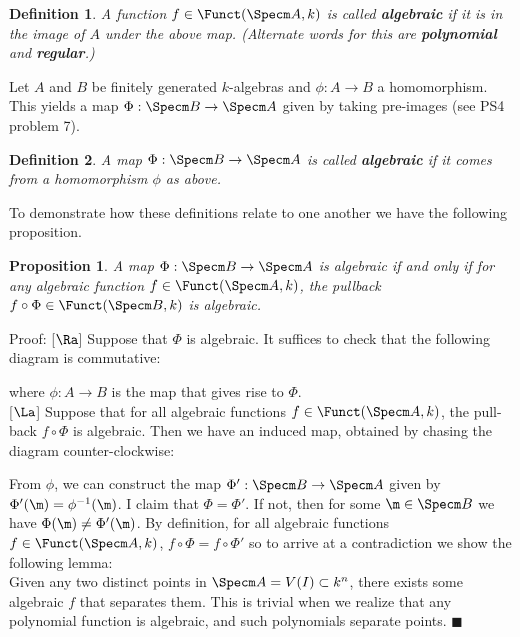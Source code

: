 \documentclass[10 pt]{article}
\newtheorem{prop}{Proposition}[section]
\newtheorem{defn}{Definition}[section]
\newcommand\bdefn{\begin{defn}}
\newcommand\bprop{\begin{prop}}
\newcommand\edefn{\end{defn}}
\newcommand\eprop{\end{prop}}
\begin{document}
\bdefn A function $f\in \Funct(\Specm A,k)$ is called {\bf algebraic} if it is in the image of $A$ under the above map.  (Alternate words for this are {\bf polynomial} and {\bf regular}.) \edefn

Let $A$ and $B$ be finitely generated $k$-algebras and $\phi:A\rightarrow B$ a homomorphism.  This yields a map $\Phi:\Specm B\rightarrow \Specm A$ given by taking pre-images (see PS4 problem 7).

\bdefn A map $\Phi:\Specm B\rightarrow \Specm A$ is called {\bf algebraic} if it comes from a homomorphism $\phi$ as above.\edefn

To demonstrate how these definitions relate to one another we have the following proposition.

\bprop A map $\Phi:\Specm B\rightarrow \Specm A$ is algebraic if and only if for any algebraic function $f\in \Funct(\Specm A,k)$, the pullback $f\circ \Phi\in \Funct(\Specm B,k)$ is algebraic.\eprop

Proof:  [$\Ra$] Suppose that $\Phi$ is algebraic.  It suffices to check that the following diagram is commutative:\\


where $\phi:A\rightarrow B$ is the map that gives rise to $\Phi$.\\

[$\La$] Suppose that for all algebraic functions $f\in \Funct(\Specm A,k)$, the pull-back $f\circ\Phi$ is algebraic.  Then we have an induced map, obtained by chasing the diagram counter-clockwise:


From $\phi$, we can construct the map $\Phi':\Specm B \rightarrow \Specm A$ given by $\Phi'(\m)=\phi^{-1}(\m)$.  I claim that $\Phi=\Phi'$.  If not, then for some $\m\in \Specm B$ we have $\Phi(\m)\neq \Phi'(\m)$.  By definition, for all algebraic functions $f\in \Funct(\Specm A,k)$, $f\circ\Phi=f\circ\Phi'$ so to arrive at a contradiction we show the following lemma:\\
Given any two distinct points in $\Specm A=V(I)\subset k^n$, there exists some algebraic $f$ that separates them.  This is trivial when we realize that any polynomial function is algebraic, and such polynomials separate points.  $\blacksquare$
\end{document}

